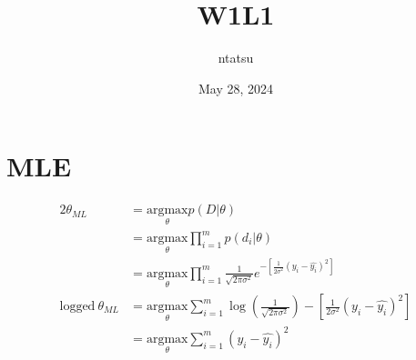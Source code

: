 \documentclass{article}
\title{W1L1}
\author{ntatsu}
\date{May 28, 2024}
\newcommand{\uset}[2]{\underset{#1}{#2}}
\newcommand{\mr}[1]{\mathrm{#1}}
\theoremstyle{definition}
\theoremstyle{remark}
\begin{document}
\maketitle

\section{MLE}


\begin{alignat*}{2}
  \theta_{ML} &= \uset{\theta}{\mr{argmax}} p(D | \theta) \\
  &= \uset{\theta}{\mr{argmax}} \prod_{i=1}^m p(d_i | \theta) \\
  &= \uset{\theta}{\mr{argmax}} \prod_{i=1}^m \frac{1}{\sqrt{2\pi\sigma^2}} e^{-[\frac{1}{2\sigma^2}(y_i - \hat{y_i})^2]} \\
  \text{logged} \ \theta_{ML}  &= \uset{\theta}{\mr{argmax}} \sum_{i=1}^m \log (\frac{1}{\sqrt{2\pi\sigma^2}}) -[\frac{1}{2\sigma^2}(y_i - \hat{y_i})^2] \\
  &= \uset{\theta}{\mr{argmax}} \sum_{i=1}^m (y_i - \hat{y_i})^2
\end{alignat*}
\end{document}
